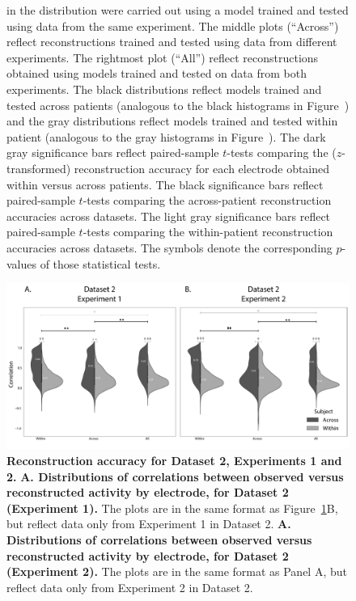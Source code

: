 \documentclass[10pt]{article}
\begin{document}
\begin{figure}[p]
{in the distribution were carried out using a model trained and tested using data
from the same experiment.  The middle plots (``Across'') reflect reconstructions
trained and tested using data from different experiments.  The rightmost plot
(``All'') reflect reconstructions obtained using models trained and tested on
data from both experiments.  The black distributions reflect models trained and
tested across patients (analogous to the black histograms in Figure~\corrmaps)
and the gray distributions reflect models trained and tested within patient
(analogous to the gray histograms in Figure~\corrmaps).  The dark gray
significance bars reflect paired-sample $t$-tests comparing the
($z$-transformed) reconstruction accuracy for each electrode obtained within
versus across patients.  The black significance bars reflect paired-sample
$t$-tests comparing the across-patient reconstruction accuracies across
datasets.  The light gray significance bars reflect paired-sample $t$-tests
comparing the within-patient reconstruction accuracies across datasets.  The
symbols denote the corresponding $p$-values of those statistical tests.}
\label{fig:supplemental_1}
\end{figure}


\begin{figure}[p]
\centering
\includegraphics[width=\textwidth]{figs/supplemental_2}
\caption{\textbf{Reconstruction accuracy for Dataset 2, Experiments 1
    and 2.}  \textbf{A. Distributions of correlations between observed
    versus reconstructed activity by electrode, for Dataset 2
    (Experiment 1).}  The plots are in the same format as
  Figure~\ref{fig:supplemental_1}B, but reflect data only from
  Experiment 1 in Dataset 2.  \textbf{A. Distributions of correlations between observed
    versus reconstructed activity by electrode, for Dataset 2
    (Experiment 2).}  The plots are in the same format as Panel A, but
    reflect data only from Experiment 2 in Dataset 2.}
\label{fig:supplemental_2}
\end{figure}
\end{document}
